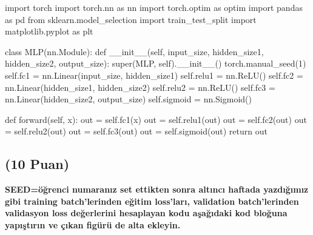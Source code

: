 \documentclass[11pt]{article}
\begin{document}
\begin{python}
import torch
import torch.nn as nn
import torch.optim as optim
import pandas as pd
from sklearn.model_selection import train_test_split
import matplotlib.pyplot as plt

class MLP(nn.Module):
    def __init__(self, input_size, hidden_size1, hidden_size2, output_size):
        super(MLP, self).__init__()
        torch.manual_seed(1)
        self.fc1 = nn.Linear(input_size, hidden_size1)
        self.relu1 = nn.ReLU()
        self.fc2 = nn.Linear(hidden_size1, hidden_size2)
        self.relu2 = nn.ReLU()
        self.fc3 = nn.Linear(hidden_size2, output_size)
        self.sigmoid = nn.Sigmoid()

    def forward(self, x):
        out = self.fc1(x)
        out = self.relu1(out)
        out = self.fc2(out)
        out = self.relu2(out)
        out = self.fc3(out)
        out = self.sigmoid(out)
        return out
\end{python}

\subsection{(10 Puan)} \textbf{SEED=öğrenci numaranız set ettikten sonra altıncı haftada yazdığımız gibi training batch'lerinden eğitim loss'ları, validation batch'lerinden validasyon loss değerlerini hesaplayan kodu aşağıdaki kod bloğuna yapıştırın ve çıkan figürü de alta ekleyin.}
\end{document}

